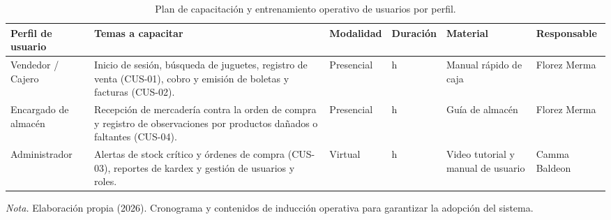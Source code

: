 \begin{table}[H]
  \centering
  \footnotesize
  \caption{Plan de capacitación y entrenamiento operativo de usuarios por perfil.}
  \label{tab:despliegue_capacitacion}
  \begin{tabularx}{\linewidth}{|>{\raggedright\arraybackslash}p{2.2cm}|>{\raggedright\arraybackslash}X|>{\centering\arraybackslash}p{2.0cm}|>{\centering\arraybackslash}p{1.6cm}|>{\raggedright\arraybackslash}p{2.2cm}|>{\raggedright\arraybackslash}p{2.5cm}|}
    \hline
    \textbf{Perfil de usuario} & \textbf{Temas a capacitar} & \textbf{Modalidad} & \textbf{Duración} & \textbf{Material} & \textbf{Responsable} \\ \hline
    Vendedor / Cajero & Inicio de sesión, búsqueda de juguetes, registro de venta (CUS-01), cobro y emisión de boletas y facturas (CUS-02). & Presencial & 2 h & Manual rápido de caja & Florez Merma \\ \hline
    Encargado de almacén & Recepción de mercadería contra la orden de compra y registro de observaciones por productos dañados o faltantes (CUS-04). & Presencial & 1 h & Guía de almacén & Florez Merma \\ \hline
    Administrador & Alertas de stock crítico y órdenes de compra (CUS-03), reportes de kardex y gestión de usuarios y roles. & Virtual & 1 h & Video tutorial y manual de usuario & Camma Baldeon \\ \hline
  \end{tabularx}
  \par\vspace{0.2cm}
  {\raggedright \small \emph{Nota.} Elaboración propia (2026). Cronograma y contenidos de inducción operativa para garantizar la adopción del sistema.\par}
\end{table}

